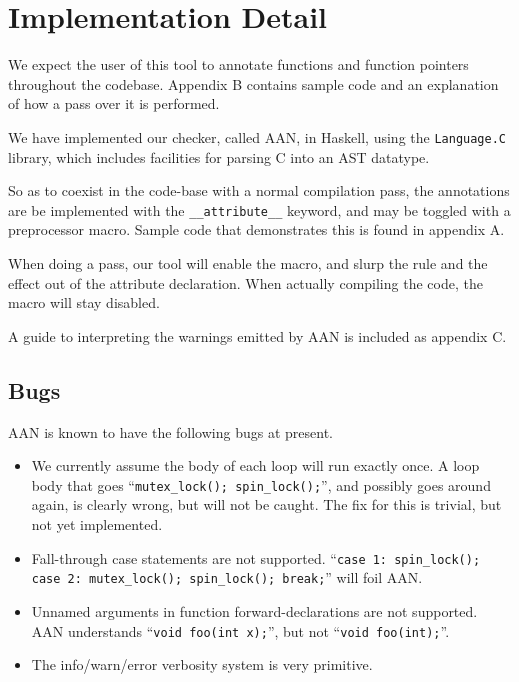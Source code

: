\documentclass{article}
\begin{document}

\section{Implementation Detail}

We expect the user of this tool to annotate functions and function pointers throughout the codebase. Appendix B contains sample code and an explanation of how a pass over it is performed.

We have implemented our checker, called AAN, in Haskell, using the \texttt{Language.C} library, which includes facilities for parsing C into an AST datatype.

So as to coexist in the code-base with a normal compilation pass, the annotations are be implemented with the \texttt{\_\_attribute\_\_} keyword, and may be toggled with a preprocessor macro. Sample code that demonstrates this is found in appendix A.

When doing a pass, our tool will enable the macro, and slurp the rule and the effect out of the attribute declaration. When actually compiling the code, the macro will stay disabled.

A guide to interpreting the warnings emitted by AAN is included as appendix C.

\subsection{Bugs}

AAN is known to have the following bugs at present.

\begin{itemize}
	\item We currently assume the body of each loop will run exactly once.
		A loop body that goes ``\texttt{mutex\_lock(); spin\_lock();}'', and possibly goes around again, is clearly wrong, but will not be caught.
		The fix for this is trivial, but not yet implemented.
	\item Fall-through case statements are not supported. ``\texttt{case 1: spin\_lock(); case 2: mutex\_lock(); spin\_lock(); break;}'' will foil AAN.
	\item Unnamed arguments in function forward-declarations are not supported. AAN understands ``\texttt{void foo(int x);}'', but not ``\texttt{void foo(int);}''.
	\item The info/warn/error verbosity system is very primitive.
\end{itemize}
\end{document}
